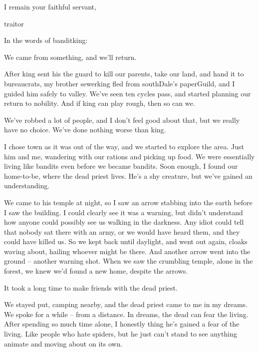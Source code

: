 \begin{multicols}{2}
\begin{exampletext}
  I remain your faithful servant,

  \gls{traitor}

\end{exampletext}

In the words of \gls{banditking}:

\begin{exampletext}

  We came from something, and we'll return.

  After \gls{king} sent his the \gls{guard} to kill our parents, take our land, and hand it to bureaucrats, my brother \gls{sewerking} fled from \gls{southDale}'s \gls{paperGuild}, and I guided him safely to \gls{valley}.
  We've seen ten cycles pass, and started planning our return to nobility.
  And if \gls{king} can play rough, then so can we.

  We've robbed a lot of people, and I don't feel good about that, but we really have no choice.
  We've done nothing worse than \gls{king}.

  I chose \gls{town} as it was out of the way, and we started to explore the area.
  Just him and me, wandering with our rations and picking up food.
  We were essentially living like bandits even before we became bandits.
  Soon enough, I found our home-to-be, where the dead priest lives.
  He's a shy creature, but we've gained an understanding.

  We came to his temple at night, so I saw an arrow stabbing into the earth before I saw the building.
  I could clearly see it was a warning, but didn't understand how anyone could possibly see us walking in the darkness.
  Any idiot could tell that nobody sat there with an army, or we would have heard them, and they could have killed us.
  So we kept back until daylight, and went out again, cloaks waving about, hailing whoever might be there.
  And another arrow went into the ground -- another warning shot.
  When we saw the crumbling temple, alone in the forest, we knew we'd found a new home, despite the arrows.

  It took a long time to make friends with the dead priest.

  We stayed put, camping nearby, and the dead priest came to me in my dreams.
  We spoke for a while -- from a distance.
  In dreams, the dead can fear the living.
  After spending so much time alone, I honestly thing he's gained a fear of the living.
  Like people who hate spiders, but he just can't stand to see anything animate and moving about on its own.


\end{exampletext}
\end{multicols}
